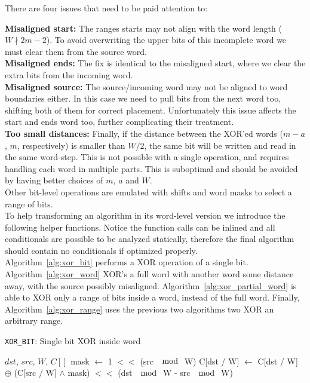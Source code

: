 There are four issues that need to be paid attention to:

\textbf{Misaligned start:}
The ranges starts may not align with the word length ($W \nmid 2m-2$). To avoid overwriting the upper bits of this incomplete word we must clear them from the source word. \\

\textbf{Misaligned ends:}
The fix is identical to the misaligned start, where we clear the extra bits from the incoming word. \\

\textbf{Misaligned source:}
The source/incoming word may not be aligned to word boundaries either. In this case we need to pull bits from the next word too, shifting both of them for correct placement. Unfortunately this issue affects the start and ends word too, further complicating their treatment. \\

\textbf{Too small distances:}
Finally, if the distance between the XOR'ed words ($m-a$, $m$, respectively) is smaller than $W/2$, the same bit will be written and read in the same word-step. This is not possible with a single operation, and requires handling each word in multiple parts. This is suboptimal and should be avoided by having better choices of $m$, $a$ and $W$. \\

Other bit-level operations are emulated with shifts and word masks to select a range of bits. \\

To help transforming an algorithm in its word-level version we introduce the following helper functions. Notice the function calls can be inlined and all conditionals are possible to be analyzed statically, therefore the final algorithm should contain no conditionals if optimized properly. \\

Algorithm~\ref{alg:xor_bit} performs a XOR operation of a single bit. Algorithm~\ref{alg:xor_word} XOR's a full word with another word some distance away, with the source possibly misaligned. Algorithm~\ref{alg:xor_partial_word} is able to XOR only a range of bits inside a word, instead of the full word. Finally, Algorithm~\ref{alg:xor_range} uses the previous two algorithms two XOR an arbitrary range. \\


\begin{algorithm}
\caption{\texttt{XOR\_BIT}: Single bit XOR inside word}
\label{alg:xor_bit}
\begin{algorithmic}[1]
  \REQUIRE $dst$, $src$, $W$, $C[]$
  \STATE mask $\gets$ 1 $<<$ (src $\mod$ W)
  \STATE C[dst / W] $\gets$ C[dst / W] $\oplus$ (C[src / W] $\land$ mask) $<<$ (dst $\mod$ W - src $\mod$ W)
\end{algorithmic}
\end{algorithm}

